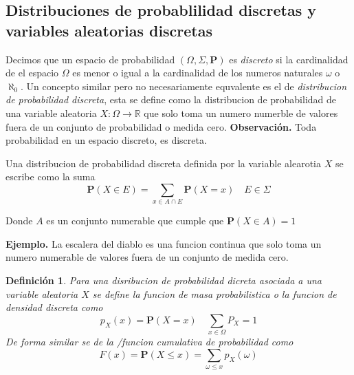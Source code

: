\documentclass[letterpaper]{article}
\newtheorem{def.}{Definici\'on}[section]
\newcommand{\prob}{\textbf{P}}
\newcommand{\eje}{{\newline \noindent \sc \textbf{Ejemplo. }}}
\newcommand{\obs}{{\newline \noindent \sc \textbf{Observación. }}}
\newcommand{\om}{\ensuremath{\Omega}}
\newcommand{\sig}{\ensuremath{\Sigma}}
\newcommand{\re}{\ensuremath{\mathbb R }}
\begin{document}
\subsection{Distribuciones de probablilidad discretas y variables aleatorias discretas}
\label{sec:orgdf55d56}

\noindent Decimos que un espacio de probabilidad \((\om,\sig,\prob)\) es \emph{discreto} si la cardinalidad de el espacio \(\om\) es menor o igual a la cardinalidad de los numeros naturales \(\omega\) o \(\aleph_0\). Un concepto similar pero no necesariamente equvalente es el de \emph{distribucion de probabilidad discreta}, esta se define como la distribucion de probabilidad de una variable aleatoria \(X:\om\rightarrow\re\) que solo toma un numero numerble de valores fuera de un conjunto de probabilidad o medida cero.
\obs Toda probabilidad en un espacio discreto, es discreta.

Una distribucion de probabilidad discreta definida por la variable alearotia \(X\) se escribe como la suma
\[
    \prob(X\in E)=\sum_{x\in A\cap E}\prob(X=x)\quad E\in\sig
\]

Donde \(A\) es un conjunto numerable que cumple que \(\prob(X\in A)=1\)

\eje La escalera del diablo es una funcion continua que solo toma un numero numerable de valores fuera de un conjunto de medida cero.

\begin{def.}
Para una disribucion de probabilidad dicreta asociada a una variable aleatoria \(X\) se define la \emph{funcion de masa probabilistica} o la \emph{funcion de densidad discreta} como
\[
        p_{X}(x)=\prob(X=x)\quad\sum_{x\in\om}P_{X}=1
\]
De forma similar se de la /funcion cumulativa de probabilidad como
\[
        F(x)=\prob(X\leq x)=\sum_{\omega\leq x}p_{X}(\omega)
\]
\end{def.}
\end{document}
